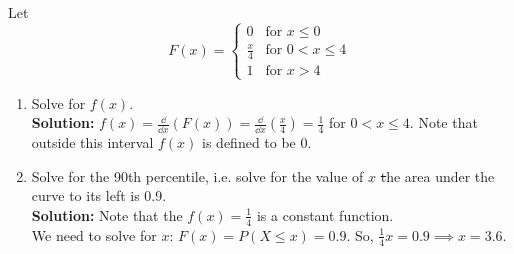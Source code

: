 \begin{example}
    Let
    \[
        F(x) = 
        \begin{cases} 
        0 & \text{for } x \leq 0 \\
        \frac{x}{4} & \text{for } 0 < x \leq 4 \\
        1 & \text{for } x > 4 
        \end{cases}
    \]
    \begin{enumerate}[label=(\alph*)]
        \item Solve for $f(x)$. \\
        \textbf{Solution:} $f(x) = \frac{\dd}{\dd{x}} \left( F(x) \right) = \frac{\dd}{\dd{x}} \left( \frac{x}{4} \right) = \frac{1}{4}$ for $0 < x \leq 4$. Note that outside this interval $f(x)$ is defined to be 0.
        \item Solve for the 90th percentile, i.e. solve for the value of $x$ \st the area under the curve to its left is 0.9. \\
        \textbf{Solution:} Note that the $f(x) = \frac{1}{4}$ is a constant function. \\
        We need to solve for $x$: $F(x) = P(X \leq x) = 0.9$. So, $\frac{1}{4} x = 0.9 \implies x = 3.6$.
    \end{enumerate}
\end{example}

\pagebreak

